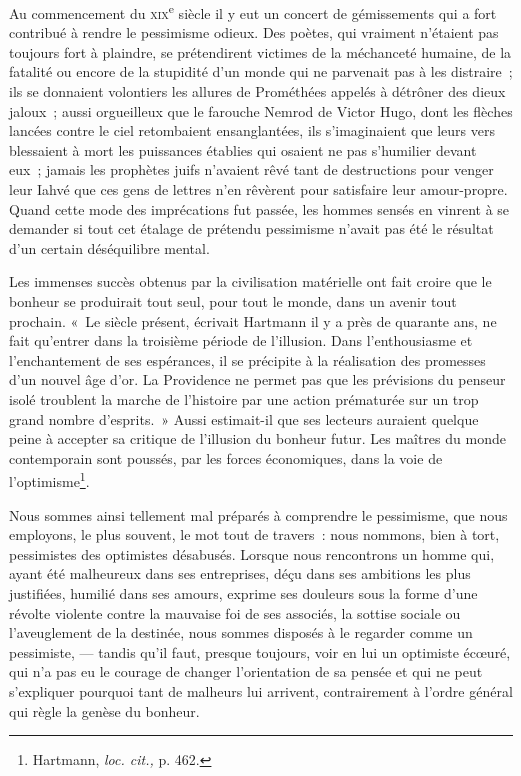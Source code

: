 \documentclass[french,twoside]{book} %
\begin{document}
Au commencement du {\scshape xix}\textsuperscript{e} siècle il y eut un concert de gémissements qui a fort contribué à rendre le pessimisme odieux. Des poètes, qui vraiment n’étaient pas toujours fort à plaindre, se prétendirent victimes de la méchanceté humaine, de la fatalité ou encore de la stupidité d’un monde qui ne parvenait pas à les distraire ; ils se donnaient volontiers les allures de Prométhées appelés à détrôner des dieux jaloux ; aussi orgueilleux que le farouche Nemrod de Victor Hugo, dont les flèches  lancées contre le ciel retombaient ensanglantées, ils s’imaginaient que leurs vers blessaient à mort les puissances établies qui osaient ne pas s’humilier devant eux ; jamais les prophètes juifs n’avaient rêvé tant de destructions pour venger leur Iahvé que ces gens de lettres n’en rêvèrent pour satisfaire leur amour-propre. Quand cette mode des imprécations fut passée, les hommes sensés en vinrent à se demander si tout cet étalage de prétendu pessimisme n’avait pas été le résultat d’un certain déséquilibre mental.\par
Les immenses succès obtenus par la civilisation matérielle ont fait croire que le bonheur se produirait tout seul, pour tout le monde, dans un avenir tout prochain. « Le siècle présent, écrivait Hartmann il y a près de quarante ans, ne fait qu’entrer dans la troisième période de l’illusion. Dans l’enthousiasme et l’enchantement de ses espérances, il se précipite à la réalisation des promesses d’un nouvel âge d’or. La Providence ne permet pas que les prévisions du penseur isolé troublent la marche de l’histoire par une action prématurée sur un trop grand nombre d’esprits. » Aussi estimait-il que ses lecteurs auraient quelque peine à accepter sa critique de l’illusion du bonheur futur. Les maîtres du monde contemporain sont poussés, par les forces économiques, dans la voie de l’optimisme\footnote{ \noindent Hartmann, \emph{loc. cit.,} p. 462.
 }.\par
Nous sommes ainsi tellement mal préparés à comprendre le pessimisme, que nous employons, le plus souvent, le mot tout de travers : nous nommons, bien à tort, pessimistes des optimistes désabusés. Lorsque nous rencontrons  un homme qui, ayant été malheureux dans ses entreprises, déçu dans ses ambitions les plus justifiées, humilié dans ses amours, exprime ses douleurs sous la forme d’une révolte violente contre la mauvaise foi de ses associés, la sottise sociale ou l’aveuglement de la destinée, nous sommes disposés à le regarder comme un pessimiste, — tandis qu’il faut, presque toujours, voir en lui un optimiste écœuré, qui n’a pas eu le courage de changer l’orientation de sa pensée et qui ne peut s’expliquer pourquoi tant de malheurs lui arrivent, contrairement à l’ordre général qui règle la genèse du bonheur.\par
\end{document}
